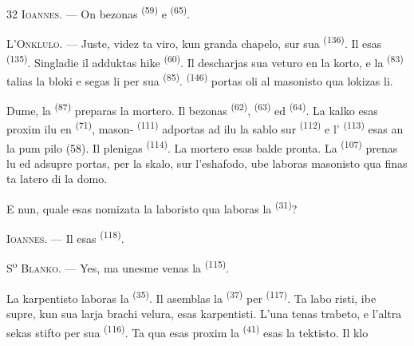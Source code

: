 \begin{VUpage}[34]{32}
\VUblancAlinea
\textsc{Ioannes}. --- On bezonas  \textsuperscript{(59)} e \cc
{} \textsuperscript{(65)}.

\VUblancAlinea
\textsc{L'Onklulo}. --- Juste, videz ta viro, kun\nl
granda chapelo, sur sua  \textsuperscript{(136)}. Il esas\nl
{} \textsuperscript{(135)}. Singladie il adduktas hike\nl
{} \textsuperscript{(60)}. Il descharjas sua veturo en la\nl
korto, e la  \textsuperscript{(83)} talias la bloki\nl
e segas li per sua  \textsuperscript{(85)}. \cc
{} \textsuperscript{(146)} portas oli al masonisto qua lokizas\nl
li.

\VUblancAlinea
Dume, la  \textsuperscript{(87)} preparas la mortero.\nl
Il bezonas  \textsuperscript{(62)},  \textsuperscript{(63)} ed  \textsuperscript{(64)}.\nl
La kalko esas proxim ilu en  \textsuperscript{(71)}, mason-\nl
{} \textsuperscript{(111)} adportas ad ilu la sablo sur\nl
{} \textsuperscript{(112)} e l' \textsuperscript{(113)} esas an la pum\cc
pilo (58). Il plenigas  \textsuperscript{(114)}. La mortero esas\nl
balde pronta. La  \textsuperscript{(107)} prenas lu\nl
ed adsupre portas, per la skalo, sur l'eshafodo,\nl
ube laboras masonisto qua finas ta latero di la\nl
domo.

\VUblancAlinea
E nun, quale esas nomizata la laboristo qua\nl
laboras la  \textsuperscript{(31)}?

\VUblancAlinea
\textsc{Ioannes}. --- Il esas  \textsuperscript{(118)}.

\VUsaut{3.0mm}
\VUsaut{3.0mm}

\VUblancAlinea
S\textsuperscript{o} \textsc{Blanko}. --- Yes, ma unesme venas la\nl
{} \textsuperscript{(115)}.

\VUblancAlinea
La karpentisto laboras la  \textsuperscript{(35)}. Il\nl
asemblas la  \textsuperscript{(37)} per  \textsuperscript{(117)}. Ta labo\cc
risti, ibe supre, kun sua larja brachi velura,\nl
esas karpentisti. L'una tenas trabeto, e l'altra\nl
sekas stifto per sua  \textsuperscript{(116)}. Ta qua esas\nl
proxim la  \textsuperscript{(41)} esas la tektisto. Il klo\cc
\parplein
\end{VUpage}

